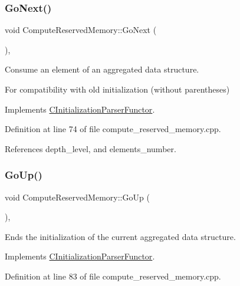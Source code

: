 \subsubsection{\texorpdfstring{Go\+Next()}{GoNext()}}
{\footnotesize\ttfamily void Compute\+Reserved\+Memory\+::\+Go\+Next (\begin{DoxyParamCaption}{ }\end{DoxyParamCaption})\hspace{0.3cm}{\ttfamily [override]}, {\ttfamily [virtual]}}



Consume an element of an aggregated data structure. 

For compatibility with old initialization (without parentheses) 

Implements \hyperlink{classCInitializationParserFunctor_a4f9a305b8ecfba8a372583123b2878ed}{C\+Initialization\+Parser\+Functor}.



Definition at line 74 of file compute\+\_\+reserved\+\_\+memory.\+cpp.



References depth\+\_\+level, and elements\+\_\+number.

\mbox{\label{classComputeReservedMemory_acce81c68136abf8d4f6db310947454bf}} 
\subsubsection{\texorpdfstring{Go\+Up()}{GoUp()}}
{\footnotesize\ttfamily void Compute\+Reserved\+Memory\+::\+Go\+Up (\begin{DoxyParamCaption}{ }\end{DoxyParamCaption})\hspace{0.3cm}{\ttfamily [override]}, {\ttfamily [virtual]}}



Ends the initialization of the current aggregated data structure. 



Implements \hyperlink{classCInitializationParserFunctor_ac502a0c076635becd22e65f2281c5c46}{C\+Initialization\+Parser\+Functor}.



Definition at line 83 of file compute\+\_\+reserved\+\_\+memory.\+cpp.



